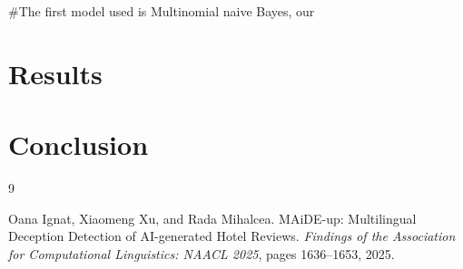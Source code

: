 \documentclass{article}
\begin{document}
#The first model used is Multinomial naive Bayes, our 

\section{Results}
\section{Conclusion}

\begin{thebibliography}{9}

Oana Ignat, Xiaomeng Xu, and Rada Mihalcea.
\newblock MAiDE-up: Multilingual Deception Detection of AI-generated Hotel Reviews.
\newblock \textit{Findings of the Association for Computational Linguistics: NAACL 2025}, pages 1636--1653, 2025.

\end{thebibliography}
\end{document}
